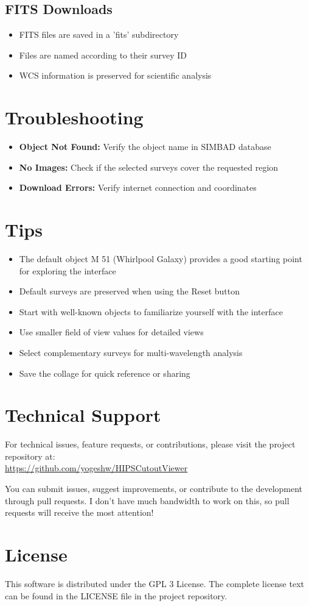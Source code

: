 \documentclass{article}
\begin{document}
\subsection{FITS Downloads}
\begin{itemize}
    \item FITS files are saved in a 'fits' subdirectory
    \item Files are named according to their survey ID
    \item WCS information is preserved for scientific analysis
\end{itemize}

\section{Troubleshooting}
\begin{itemize}
    \item \textbf{Object Not Found:} Verify the object name in SIMBAD database
    \item \textbf{No Images:} Check if the selected surveys cover the requested region
    \item \textbf{Download Errors:} Verify internet connection and coordinates
\end{itemize}

\section{Tips}
\begin{itemize}
    \item The default object M 51 (Whirlpool Galaxy) provides a good starting point for exploring the interface
    \item Default surveys are preserved when using the Reset button
    \item Start with well-known objects to familiarize yourself with the interface
    \item Use smaller field of view values for detailed views
    \item Select complementary surveys for multi-wavelength analysis
    \item Save the collage for quick reference or sharing
\end{itemize}

\section{Technical Support}
For technical issues, feature requests, or contributions, please visit the project repository at:\\
\url{https://github.com/yogeshw/HIPSCutoutViewer}

You can submit issues, suggest improvements, or contribute to the development through pull requests. I don't have much bandwidth to work on this, so pull requests will receive the most attention!

\section{License}
This software is distributed under the GPL 3 License. The complete license text can be found in the LICENSE file in the project repository.
\end{document}
